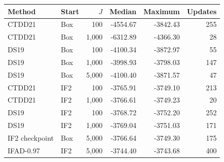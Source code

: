 \begin{tabular}{llrrrr}
\toprule
Method & Start & $J$ & Median & Maximum & Updates \\
\midrule
CTDD21 & Box & 100 & -4554.67 & -3842.43 & 255 \\
CTDD21 & Box & 1,000 & -6312.89 & -4366.30 & 28 \\
DS19 & Box & 100 & -4100.34 & -3872.97 & 55 \\
DS19 & Box & 1,000 & -3998.93 & -3798.03 & 147 \\
DS19 & Box & 5,000 & -4100.40 & -3871.57 & 47 \\
CTDD21 & IF2 & 100 & -3765.91 & -3749.10 & 213 \\
CTDD21 & IF2 & 1,000 & -3766.61 & -3749.23 & 20 \\
DS19 & IF2 & 100 & -3768.72 & -3752.20 & 252 \\
DS19 & IF2 & 1,000 & -3769.04 & -3751.03 & 171 \\
IF2 checkpoint & Box & 5,000 & -3766.64 & -3749.30 & 175 \\
IFAD-0.97 & IF2 & 5,000 & -3744.40 & -3743.68 & 400 \\
\bottomrule
\end{tabular}
